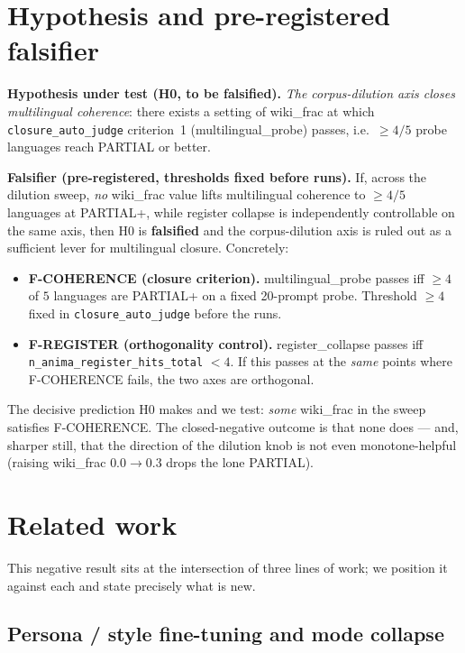 \documentclass[11pt,a4paper]{article}
\begin{document}
\section{Hypothesis and pre-registered falsifier}
\label{sec:hypothesis}

\textbf{Hypothesis under test (H0, to be falsified).} \emph{The
corpus-dilution axis closes multilingual coherence}: there exists a
setting of wiki\_frac at which \verb|closure_auto_judge| criterion~1
(multilingual\_probe) passes, i.e.\ $\geq 4/5$ probe languages reach
PARTIAL or better.

\medskip
\noindent\textbf{Falsifier (pre-registered, thresholds fixed before
runs).} If, across the dilution sweep, \emph{no} wiki\_frac value lifts
multilingual coherence to $\geq 4/5$ languages at PARTIAL+, while register
collapse is independently controllable on the same axis, then H0 is
\textbf{falsified} and the corpus-dilution axis is ruled out as a
sufficient lever for multilingual closure. Concretely:
\begin{itemize}\itemsep0.2em
\item \textbf{F-COHERENCE (closure criterion).} multilingual\_probe passes
  iff $\geq 4$ of $5$ languages are PARTIAL+ on a fixed 20-prompt probe.
  Threshold $\geq 4$ fixed in \verb|closure_auto_judge| before the runs.
\item \textbf{F-REGISTER (orthogonality control).} register\_collapse
  passes iff \verb|n_anima_register_hits_total| $< 4$. If this passes at
  the \emph{same} points where F-COHERENCE fails, the two axes are
  orthogonal.
\end{itemize}

\noindent The decisive prediction H0 makes and we test: \emph{some}
wiki\_frac in the sweep satisfies F-COHERENCE. The closed-negative outcome
is that none does --- and, sharper still, that the direction of the
dilution knob is not even monotone-helpful (raising wiki\_frac $0.0\to0.3$
drops the lone PARTIAL).

\section{Related work}
\label{sec:related}

This negative result sits at the intersection of three lines of work; we
position it against each and state precisely what is new.

\subsection{Persona / style fine-tuning and mode collapse}
\end{document}
